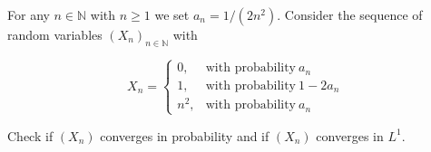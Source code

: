 For any \(\mathit{n} \in \mathbb{N}\) with \(\mathit{n} \geq 1\) we set \(\mathit{a}_{\mathit{n}} = 1/\left( {2\mathit{n}^{2}} \right)\). Consider the sequence of random variables \(\left( \mathit{X}_{\mathit{n}} \right)_{\mathit{n} \in \mathbb{N}}\) with

\[\mathit{X}_{\mathit{n}} = \left\{ \begin{matrix}
{0,} & {\text{with probability}\ \mathit{a}_{\mathit{n}}} \\
{1,} & {\text{with probability}\ 1 - 2\mathit{a}_{\mathit{n}}} \\
{\mathit{n}^{2},} & {\text{with probability}\ \mathit{a}_{\mathit{n}}}
\end{matrix} \right.\]

Check if \(\left( \mathit{X}_{\mathit{n}} \right)\) converges in probability and if \(\left( \mathit{X}_{\mathit{n}} \right)\) converges in \(\mathit{L}^{1}\).

